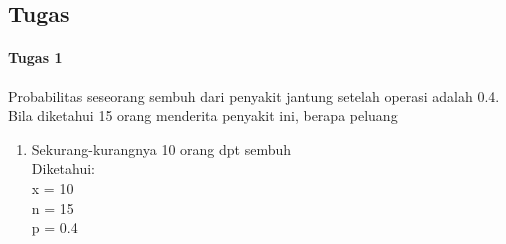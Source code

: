\documentclass[a4paper,12pt]{article}
\begin{document}
\subsection{Tugas}
\paragraph{Tugas 1\\}
Probabilitas seseorang sembuh dari penyakit jantung setelah operasi adalah 0.4. Bila
diketahui 15 orang menderita penyakit ini, berapa peluang
\begin{enumerate}[label = \alph*.]
	\item Sekurang-kurangnya 10 orang dpt sembuh\\
	Diketahui: \\
	x = 10\\
	n = 15\\
	p = 0.4\\
\end{enumerate}
\end{document}
